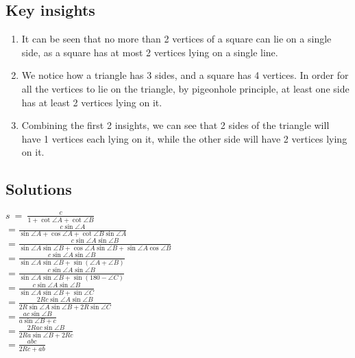 \documentclass[12pt]{scrartcl}
\begin{document}
\subsection{Key insights}
\begin{enumerate}
	\item It can be seen that no more than 2 vertices of a square can lie on a single side, as a square has at most 2 vertices lying on a single line.
	\item We notice how a triangle has 3 sides, and a square has 4 vertices. In order for all the vertices to lie on the triangle, by pigeonhole principle, at least one side has at least 2 vertices lying on it.
	\item Combining the first 2 insights, we can see that 2 sides of the triangle will have 1 vertices each lying on it, while the other side will have 2 vertices lying on it.
\end{enumerate}

\subsection{Solutions}
\(s\ =\ \frac{c}{1+\cot \angle A+\cot \angle B}\) \\
\(=\frac{c\sin \angle A}{\sin \angle A+\cos \angle A+\cot \angle B\sin \angle A}\) \\
\(=\frac{c\sin \angle A\sin \angle B}{\sin \angle A\sin \angle B+\cos \angle A\sin \angle B+\sin \angle A\cos \angle B}\) \\
\(=\frac{c\sin \angle A\sin \angle B}{\sin \angle A\sin \angle B+\sin\left(\angle A+\angle B\right)}\) \\
\(=\frac{c\sin \angle A\sin \angle B}{\sin \angle A\sin \angle B+\sin\left(180-\angle C\right)}\) \\
\(=\frac{c\sin \angle A\sin \angle B}{\sin \angle A\sin \angle B+\sin \angle C}\) \\
\(=\frac{2Rc\sin \angle A\sin \angle B}{2R\sin \angle A\sin \angle B+2R\sin \angle C}\) \\
\(=\frac{ac\sin \angle B}{a\sin \angle B+c}\) \\
\(=\frac{2Rac\sin \angle B}{2Ra\sin \angle B+2Rc}\) \\
\(=\frac{abc}{2Rc+ab}\)



\printbibliography
\end{document}

